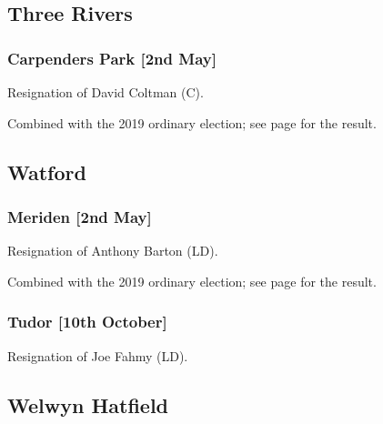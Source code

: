 \documentclass[a4paper,openany]{book}
\begin{document}
\begin{resultsiii}
\subsection*{Three Rivers}

\subsubsection*{Carpenders Park \hspace*{\fill}\nolinebreak[1]%
	\enspace\hspace*{\fill}
	[2nd May]}


Resignation of David Coltman (C).

Combined with the 2019 ordinary election; see page \pageref{CarpendersParkThreeRivers} for the result.

\subsection*{Watford}

\subsubsection*{Meriden \hspace*{\fill}\nolinebreak[1]%
	\enspace\hspace*{\fill}
	[2nd May]}


Resignation of Anthony Barton (LD).

Combined with the 2019 ordinary election; see page \pageref{WatfordMeriden} for the result.

\subsubsection*{Tudor \hspace*{\fill}\nolinebreak[1]%
	\enspace\hspace*{\fill}
	[10th October]}


Resignation of Joe Fahmy (LD).

\subsection*{Welwyn Hatfield}


\end{resultsiii}
\end{document}
